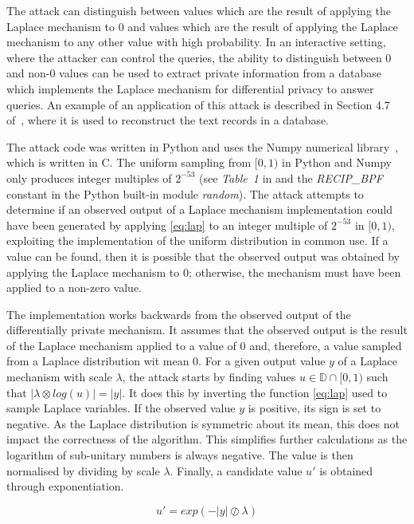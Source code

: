 \documentclass[orivec,envcountsame]{llncs}
\begin{document}
The attack can distinguish between values which are the result of applying the Laplace mechanism to 0 and values which are the result of applying the Laplace mechanism to any other value with high probability. In an interactive setting, where the attacker can control the queries, the ability to distinguish between 0 and non-0 values can be used to extract private information from a database which implements the Laplace mechanism for differential privacy to answer queries. An example of an application of this attack is described in Section 4.7 of~\cite{mironov2012significance}, where it is used to reconstruct the text records in a database.

The attack code was written in Python and uses the Numpy numerical library~\cite{harris2020array}, which is written in C. The uniform sampling from $[0, 1)$ in Python and Numpy only produces integer multiples of $2^{-53}$ (see \textit{Table~1} in \cite{mironov2012significance} and the \textit{RECIP\_BPF} constant in the Python built-in module \textit{random}). The attack attempts to determine if an observed output of a Laplace mechanism implementation could have been generated by applying \ref{eq:lap} to an integer multiple of $2^{-53}$ in $[0, 1)$, exploiting the implementation of the uniform distribution in common use. If a value can be found, then it is possible that the observed output was obtained by applying the Laplace mechanism to $0$; otherwise, the mechanism must have been applied to a non-zero value.

The implementation works backwards from the observed output of the differentially private mechanism. It assumes that the observed output is the result of the Laplace mechanism applied to a value of 0 and, therefore, a value sampled from a Laplace distribution wit mean 0. For a given output value $y$ of a Laplace mechanism with scale $\lambda$, the attack starts by finding values $ u \in \mathbb{D} \cap [0, 1)$ such that $|\lambda \otimes log(u)| = |y|$. It does this by inverting the function \ref{eq:lap} used to sample Laplace variables. If the observed value $y$ is positive, its sign is set to negative. As the Laplace distribution is symmetric about its mean, this does not impact the correctness of the algorithm. This simplifies further calculations as the logarithm of sub-unitary numbers is always negative. The value is then normalised by dividing by scale $\lambda$. Finally, a candidate value $u'$ is obtained through exponentiation.

$$u' = exp(-|y| \oslash \lambda)$$
\end{document}

